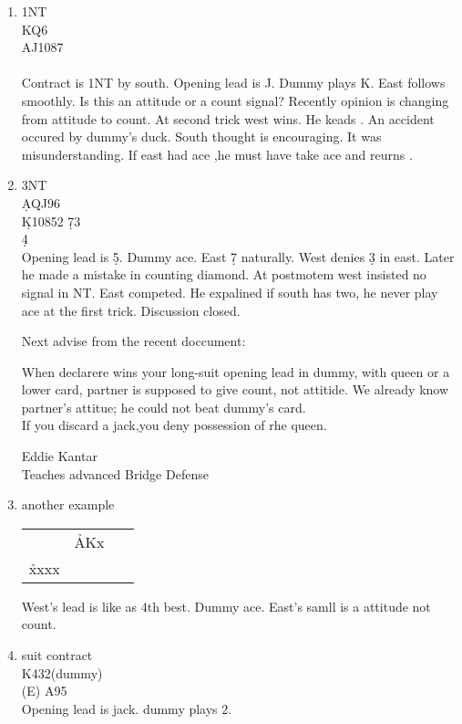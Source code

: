 \begin{enumerate}
\item{ 1NT\\
\qquad \qquad \s KQ6\\
\s AJ1087 \qquad {}\\
\qquad \qquad {}\\

Contract is 1NT by south. Opening lead is \s J. Dummy plays \s K.
East follows  smoothly. Is this an attitude or a count signal?
Recently opinion is changing from attitude to count.
At second trick west wins. He keads . An accident occured by
dummy's duck. South thought  is encouraging. It was misunderstanding.
If east had ace ,he must have take ace and reurns .

}

\item{ 3NT\\
\qquad \qquad \d AQJ96\\
\d K10852 \qquad \d 73\\
\qquad \qquad \d 4\\
Opening lead is \d 5. Dummy ace. East \d 7 naturally.
West denies \d 3 in east.  Later he made a mistake in
counting diamond. At postmotem west insisted no signal
in NT. East competed. He expalined if south has two,
he never play ace at the first trick. Discussion closed.

Next advise from the  recent doccument:

When declarere wins your long-suit opening lead in dummy,
with queen or a lower card, partner is supposed to
give count, not attitide. We already know partner's attitue;
he could not beat dummy's card.\\
If you discard a jack,you deny possession of rhe queen.
\begin{flushright}{
Eddie Kantar\\
Teaches advanced Bridge Defense}
\end{flushright}
}
\item{
another example\\
\begin{tabular}[t]{lll}
 \  & \h AKx       & \ \\
 \h xxxx & \ \ \ \  & \\
 \end{tabular}

West's lead is like as 4th best. Dummy ace. East's
samll is a attitude not count.



}


\item{ suit contract\\
\qquad \qquad K432(dummy)\\
\qquad \qquad \qquad (E) A95\\
Opening lead is jack. dummy plays 2.
}
\end{enumerate}


